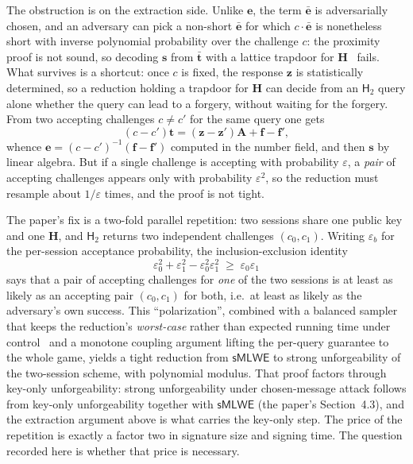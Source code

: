 \documentclass{aicr-conjecture}
\newcommand{\smlwe}{\mathsf{sMLWE}}
\newcommand{\Htwo}{\mathsf{H}_2}
\begin{document}
The obstruction is on the extraction side. Unlike $\mathbf{e}$, the
term $\bar{\mathbf{e}}$ is adversarially chosen, and an adversary can
pick a non-short $\bar{\mathbf{e}}$ for which $c \cdot \bar{\mathbf{e}}$
is nonetheless short with inverse polynomial probability over the
challenge $c$: the proximity proof is not sound, so decoding
$\mathbf{s}$ from $\bar{\mathbf{t}}$ with a lattice trapdoor for
$\mathbf{H}$~\cite{MP12} fails. What survives is a shortcut: once $c$
is fixed, the response $\mathbf{z}$ is statistically determined, so a
reduction holding a trapdoor for $\mathbf{H}$ can decide from an
$\Htwo$ query alone whether the query can lead to a forgery, without
waiting for the forgery. From two accepting challenges $c \neq c'$ for
the same query one gets
\[
  (c-c')\mathbf{t} = (\mathbf{z}-\mathbf{z}')\mathbf{A}
    + \mathbf{f} - \mathbf{f}',
\]
whence $\mathbf{e} = (c-c')^{-1}(\mathbf{f}-\mathbf{f}')$ computed in
the number field, and then $\mathbf{s}$ by linear algebra. But if a
single challenge is accepting with probability $\varepsilon$, a
\emph{pair} of accepting challenges appears only with probability
$\varepsilon^2$, so the reduction must resample about $1/\varepsilon$
times, and the proof is not tight.

The paper's fix is a two-fold parallel repetition: two sessions share
one public key and one $\mathbf{H}$, and $\Htwo$ returns two
independent challenges $(c_0,c_1)$. Writing $\varepsilon_b$ for the
per-session acceptance probability, the inclusion-exclusion identity
\[
  \varepsilon_0^2 + \varepsilon_1^2 - \varepsilon_0^2\varepsilon_1^2
    \;\ge\; \varepsilon_0\varepsilon_1
\]
says that a pair of accepting challenges for \emph{one} of the two
sessions is at least as likely as an accepting pair $(c_0,c_1)$ for
both, i.e.\ at least as likely as the adversary's own success. This
``polarization'', combined with a balanced sampler that keeps the
reduction's \emph{worst-case} rather than expected running time under
control~\cite{JT20} and a monotone coupling argument lifting the
per-query guarantee to the whole game, yields a tight reduction from
$\smlwe$ to strong unforgeability of the two-session scheme, with
polynomial modulus. That proof factors through key-only unforgeability:
strong unforgeability under chosen-message attack follows from key-only
unforgeability together with $\smlwe$ (the paper's Section~4.3), and
the extraction argument above is what carries the key-only step. The
price of the repetition is exactly a factor two in signature size and
signing time. The question recorded here is whether that price is
necessary.
\end{document}
